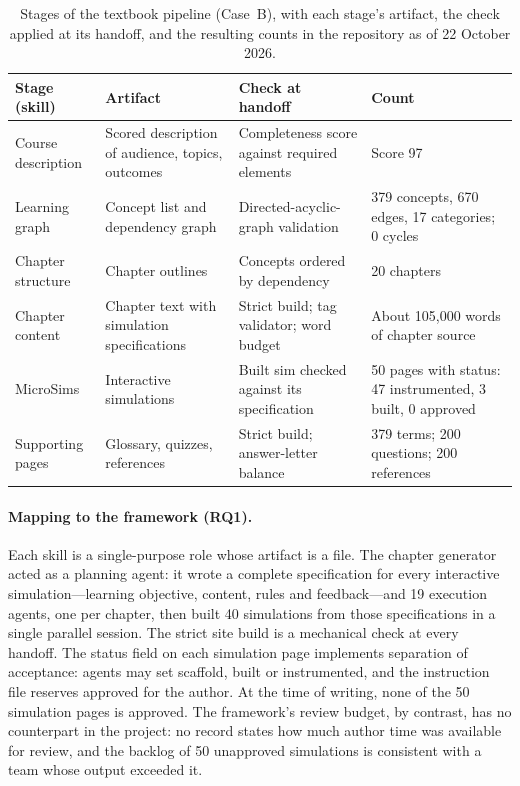 \begin{table}[htbp]
  \centering
  \caption{Stages of the textbook pipeline (Case~B), with each stage's artifact, the check
  applied at its handoff, and the resulting counts in the repository as of 22 October
  2026.}
  \label{tab:pipeline}
  \small
  \begin{tabular}{L{3.0cm}L{4.1cm}L{3.7cm}L{3.6cm}}
    \toprule
    Stage (skill) & Artifact & Check at handoff & Count \\
    \midrule
    Course description & Scored description of audience, topics, outcomes & Completeness score against required elements & Score 97 \\
    Learning graph & Concept list and dependency graph & Directed-acyclic-graph validation & 379 concepts, 670 edges, 17 categories; 0 cycles \\
    Chapter structure & Chapter outlines & Concepts ordered by dependency & 20 chapters \\
    Chapter content & Chapter text with simulation specifications & Strict build; tag validator; word budget & About 105,000 words of chapter source \\
    MicroSims & Interactive simulations & Built sim checked against its specification & 50 pages with status: 47 instrumented, 3 built, 0 approved \\
    Supporting pages & Glossary, quizzes, references & Strict build; answer-letter balance & 379 terms; 200 questions; 200 references \\
    \bottomrule
  \end{tabular}
\end{table}

\paragraph{Mapping to the framework (RQ1).} Each skill is a single-purpose role whose
artifact is a file. The chapter generator acted as a planning agent: it wrote a complete
specification for every interactive simulation---learning objective, content, rules and
feedback---and 19 execution agents, one per chapter, then built 40 simulations from those
specifications in a single parallel session. The strict site build is a mechanical check
at every handoff. The status field on each simulation page implements separation of
acceptance: agents may set \textsf{scaffold}, \textsf{built} or \textsf{instrumented}, and
the instruction file reserves \textsf{approved} for the author. At the time of writing,
none of the 50 simulation pages is approved. The framework's review budget, by contrast,
has no counterpart in the project: no record states how much author time was available
for review, and the backlog of 50 unapproved simulations is consistent with a team whose
output exceeded it.

